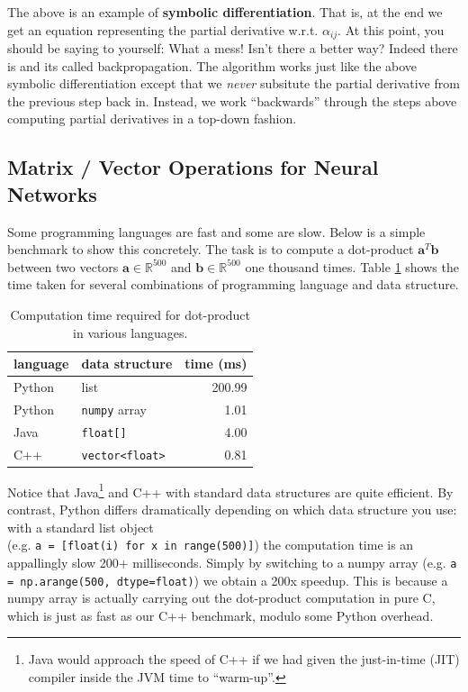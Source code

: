 \documentclass[11pt,addpoints,answers]{exam}
\newcommand{\Rb}{\mathbb{R}}
\newcommand{\av}{\mathbf{a}}
\newcommand{\bv}{\mathbf{b}}
\begin{document}
The above is an example of {\bf symbolic differentiation}. That is, at the end we get an equation representing the partial derivative w.r.t. $\alpha_{ij}$. At this point, you should be saying to yourself: What a mess! Isn't there a better way? Indeed there is and its called backpropagation. The algorithm works just like the above symbolic differentiation except that we \textit{never} subsitute the partial derivative from the previous step back in. Instead, we work ``backwards'' through the steps above computing partial derivatives in a top-down fashion. 

\subsection{Matrix / Vector Operations for Neural Networks}
\label{sec:vectorize}

Some programming languages are fast and some are slow. Below is a simple benchmark to show this concretely. The task is to compute a dot-product $\av^T \bv$ between two vectors $\av \in \Rb^{500}$ and $\bv \in \Rb^{500}$ one thousand times. Table \ref{tab:dotprod} shows the time taken for several combinations of programming language and data structure. 

\begin{table}[H]
    \begin{center}
    \begin{tabular}{llr}
        \toprule
        {\bf language} & {\bf data structure} & {\bf time (ms)} \\
        \midrule
        Python & list & 200.99 \\
        Python & \texttt{numpy} array & 1.01\\
        Java & \texttt{float[]} & 4.00 \\
        C++ & \texttt{vector<float>} & 0.81\\
        \bottomrule
    \end{tabular}
    \end{center}
    \caption{Computation time required for dot-product in various languages.}
    \label{tab:dotprod}
\end{table}

Notice that Java\footnote{Java would approach the speed of C++ if we had given the just-in-time (JIT) compiler inside the JVM time to ``warm-up''.} and C++ with standard data structures are quite efficient. By contrast, Python differs dramatically depending on which data structure you use: with a standard list object \\(e.g. \lstinline{a = [float(i) for x in range(500)]}) the computation time is an appallingly slow 200+ milliseconds. Simply by switching to a numpy array (e.g. \lstinline{a = np.arange(500, dtype=float)}) we obtain a 200x speedup. This is because a numpy array is actually carrying out the dot-product computation in pure C, which is just as fast as our C++ benchmark, modulo some Python overhead.
\end{document}
